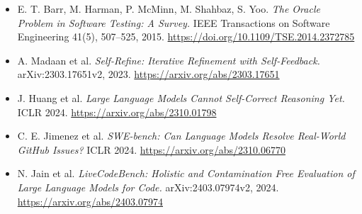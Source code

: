 \documentclass[11pt]{article}
\begin{document}
\begin{itemize}
\item [R9] E. T. Barr, M. Harman, P. McMinn, M. Shahbaz, S. Yoo. \emph{The Oracle Problem in Software Testing: A Survey.} IEEE Transactions on Software Engineering 41(5), 507–525, 2015. \url{https://doi.org/10.1109/TSE.2014.2372785}
\item [R10] A. Madaan et al. \emph{Self-Refine: Iterative Refinement with Self-Feedback.} arXiv:2303.17651v2, 2023. \url{https://arxiv.org/abs/2303.17651}
\item [R11] J. Huang et al. \emph{Large Language Models Cannot Self-Correct Reasoning Yet.} ICLR 2024. \url{https://arxiv.org/abs/2310.01798}
\item [R12] C. E. Jimenez et al. \emph{SWE-bench: Can Language Models Resolve Real-World GitHub Issues?} ICLR 2024. \url{https://arxiv.org/abs/2310.06770}
\item [R13] N. Jain et al. \emph{LiveCodeBench: Holistic and Contamination Free Evaluation of Large Language Models for Code.} arXiv:2403.07974v2, 2024. \url{https://arxiv.org/abs/2403.07974}
\end{itemize}
\end{document}
